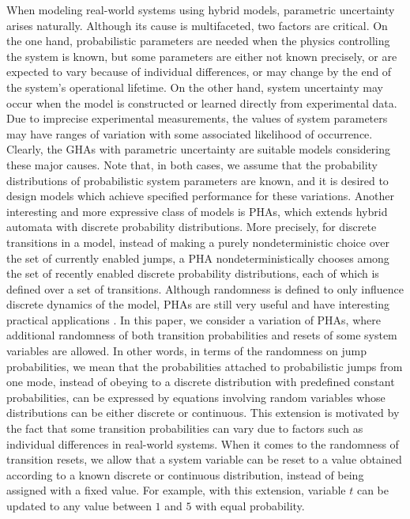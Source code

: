 When modeling real-world systems using hybrid models, parametric uncertainty arises naturally. Although its cause is multifaceted, two factors are critical. On the one hand, probabilistic parameters are needed when the physics controlling the system is known, but some parameters are either not known precisely, or are expected to vary because of individual differences, or may change by the end of the system's operational lifetime. On the other hand, system uncertainty may occur when the model is constructed or learned directly from experimental data. Due to imprecise experimental measurements, the values of system parameters may have ranges of variation with some associated likelihood of occurrence. Clearly, the GHAs with parametric uncertainty are suitable models considering these major causes. Note that, in both cases, we assume that the probability distributions of probabilistic system parameters are known, and it is desired to design models which achieve specified performance for these variations. Another interesting and more expressive class of models is PHAs, which extends hybrid automata \cite{henzinger2000theory} with discrete probability distributions. More precisely, for discrete transitions in a model, instead of making a purely nondeterministic choice over the set of currently enabled jumps, a PHA nondeterministically chooses among the set of recently enabled discrete probability distributions, each of which is defined over a set of transitions. Although randomness is defined to only influence discrete dynamics of the model, PHAs are still very useful and have interesting practical applications \cite{spr2001thesis}. In this paper, we consider a variation of PHAs, where additional randomness of both transition probabilities and resets of some system variables are allowed. In other words, in terms of the randomness on jump probabilities, we mean that the probabilities attached to probabilistic jumps from one mode, instead of obeying to a discrete distribution with predefined constant probabilities, can be expressed by equations involving random variables whose distributions can be either discrete or continuous. This extension is motivated by the fact that some transition probabilities can vary due to factors such as individual differences in real-world systems. When it comes to the randomness of transition resets, we allow that a system variable can be reset to a value obtained according to a known discrete or continuous distribution, instead of being assigned with a fixed value. For example, with this extension, variable $t$ can be updated to any value between $1$ and $5$ with equal probability. %

